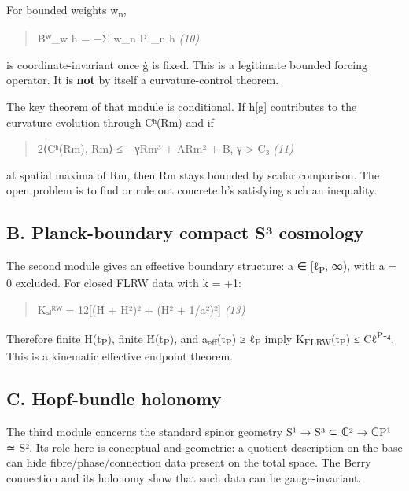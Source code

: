 \documentclass[
]{article}
\begin{document}
For bounded weights w\textsubscript{n},

\begin{quote}
Bᵂ\_w h = −Σ w\_n Pᵀ\_n h \emph{(10)}
\end{quote}

is coordinate-invariant once ġ is fixed. This is a legitimate bounded forcing operator. It is \textbf{not} by itself a curvature-control theorem.

The key theorem of that module is conditional. If h{[}g{]} contributes to the curvature evolution through Cʰ(Rm) and if

\begin{quote}
2⟨Cʰ(Rm), Rm⟩ ≤ −γ\textbar Rm\textbar³ + A\textbar Rm\textbar² + B, γ \textgreater{} C₃ \emph{(11)}
\end{quote}

at spatial maxima of \textbar Rm\textbar, then \textbar Rm\textbar{} stays bounded by scalar comparison. The open problem is to find or rule out concrete h's satisfying such an inequality.

\subsection{B. Planck-boundary compact S³ cosmology}\label{b.-planck-boundary-compact-suxb3-cosmology}

The second module gives an effective boundary structure: a ∈ {[}ℓ\textsubscript{P}, ∞), with a = 0 excluded. For closed FLRW data with k = +1:

\begin{quote}
Kₛₗᴿᵂ = 12{[}(Ḣ + H²)² + (H² + 1/a²)²{]} \emph{(13)}
\end{quote}

Therefore finite H(t\textsubscript{P}), finite Ḣ(t\textsubscript{P}), and a\textsubscript{eff}(t\textsubscript{P}) ≥ ℓ\textsubscript{P} imply K\textsubscript{FLRW}(t\textsubscript{P}) ≤ Cℓ\textsuperscript{P}⁻⁴. This is a kinematic effective endpoint theorem.

\subsection{C. Hopf-bundle holonomy}\label{c.-hopf-bundle-holonomy}

The third module concerns the standard spinor geometry S¹ → S³ ⊂ ℂ² → ℂP¹ ≃ S². Its role here is conceptual and geometric: a quotient description on the base can hide fibre/phase/connection data present on the total space. The Berry connection and its holonomy show that such data can be gauge-invariant.
\end{document}
